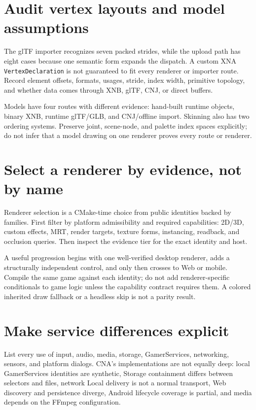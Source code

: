 \section{Audit vertex layouts and model assumptions}

The glTF importer recognizes seven packed strides, while the upload path has eight cases because
one semantic form expands the dispatch.  A custom XNA \texttt{VertexDeclaration} is not guaranteed
to fit every renderer or importer route.  Record element offsets, formats, usages, stride, index
width, primitive topology, and whether data comes through XNB, glTF, CNJ, or direct buffers.

Models have four routes with different evidence: hand-built runtime objects, binary XNB,
runtime glTF/GLB, and CNJ/offline import.  Skinning also has two ordering systems.  Preserve joint,
scene-node, and palette index spaces explicitly; do not infer that a model drawing on one renderer
proves every route or renderer.

\section{Select a renderer by evidence, not by name}

Renderer selection is a CMake-time choice from \RendererIdentityCount{} public identities backed
by \RendererFamilyCount{} families. First
filter by platform admissibility and required capabilities: 2D/3D, custom effects, MRT, render
targets, texture forms, instancing, readback, and occlusion queries.  Then inspect the evidence tier
for the exact identity and host.

A useful progression begins with one well-verified desktop renderer, adds a structurally
independent control, and only then crosses to Web or mobile.  Compile the same game against each
identity; do not add renderer-specific conditionals to game logic unless the capability contract
requires them.  A colored inherited draw fallback or a headless skip is not a parity result.

\section{Make service differences explicit}

List every use of input, audio, media, storage, GamerServices, networking, sensors, and platform
dialogs.  CNA's implementations are not equally deep: local GamerServices identities are
synthetic, Storage containment differs between selectors and files, network Local delivery is not
a normal transport, Web discovery and persistence diverge, Android lifecycle coverage is partial,
and media depends on the FFmpeg configuration.

